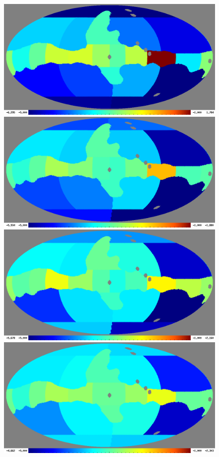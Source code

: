 \documentclass[twocolumn]{../../common/aa}
\begin{document}
\begin{figure}
        \centering
        \includegraphics[width=\linewidth]{figures/wmap23_pl2018_ut_spectral_index_scatter_alphamean_1long.png}
        \includegraphics[width=\linewidth]{figures/wmap23_plnpipe_ut_spectral_index_scatter_alphamean_1long.png}
        \includegraphics[width=\linewidth]{figures/wmap23_BP10v2_ut_spectral_index_scatter_alphamean_1long.png}
        \includegraphics[width=\linewidth]{figures/coswmap23_cos30_ut_spectral_index_scatter_alphamean_1long.png}

\end{figure}
\end{document}
